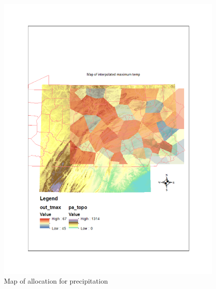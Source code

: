 \documentclass{article}\usepackage[]{graphicx}\usepackage[]{color}
\begin{document}
\begin{figure}
\includegraphics[scale=.9]{./figure/MaxTemp}
\caption{Map of allocation for precipitation}
\label{allomax}
\end{figure}
\end{document}
